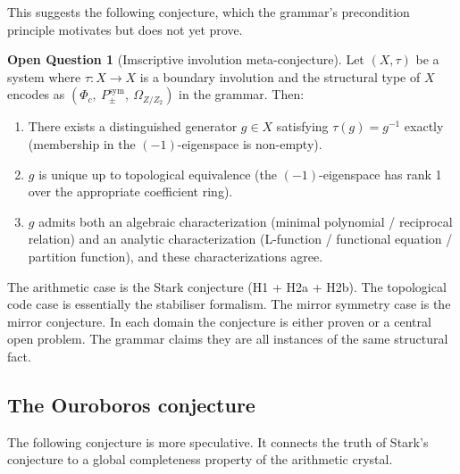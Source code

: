 \documentclass[12pt]{article}
\theoremstyle{plain}
\theoremstyle{definition}
\newtheorem{questioninner}[theoreminner]{Open Question}
\theoremstyle{remark}
\begin{document}
This suggests the following conjecture, which the grammar's precondition principle motivates
but does not yet prove.

\begin{mdframed}[style=defstyle]
\begin{questioninner}[Imscriptive involution meta-conjecture]
\label{conj:meta}
Let $(X, \tau)$ be a system where $\tau: X \to X$ is a boundary involution and the structural
type of $X$ encodes as $(\Phi_c,\ P_{\pm}^{\text{sym}},\ \Omega_{Z/Z_2})$ in the grammar.
Then:
\begin{enumerate}
  \item[(i)] There exists a distinguished generator $g \in X$ satisfying $\tau(g) = g^{-1}$
    exactly (membership in the $(-1)$-eigenspace is non-empty).
  \item[(ii)] $g$ is unique up to topological equivalence (the $(-1)$-eigenspace has rank 1
    over the appropriate coefficient ring).
  \item[(iii)] $g$ admits both an algebraic characterization (minimal polynomial / reciprocal
    relation) and an analytic characterization (L-function / functional equation / partition
    function), and these characterizations agree.
\end{enumerate}
\end{questioninner}
\end{mdframed}

\medskip

The arithmetic case is the Stark conjecture (H1 + H2a + H2b). The topological code case is
essentially the stabiliser formalism. The mirror symmetry case is the mirror conjecture. In
each domain the conjecture is either proven or a central open problem. The grammar claims they
are all instances of the same structural fact.

\subsection{The Ouroboros conjecture}

The following conjecture is more speculative. It connects the truth of Stark's conjecture to a
global completeness property of the arithmetic crystal.
\end{document}
